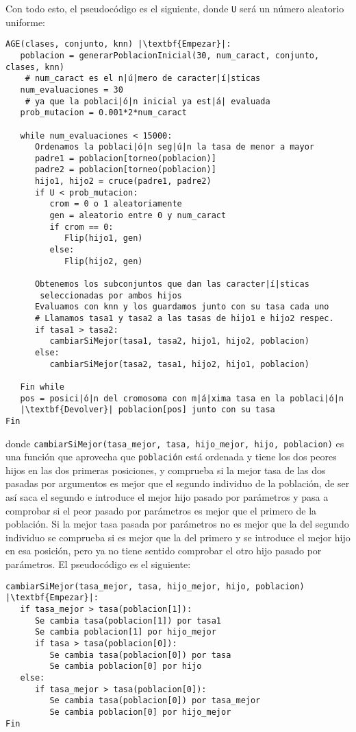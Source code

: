 \documentclass[12pt]{article}
\begin{document}
Con todo esto, el pseudocódigo es el siguiente, donde \texttt{U} será un número aleatorio uniforme:
\begin{lstlisting}
AGE(clases, conjunto, knn) |\textbf{Empezar}|:
   poblacion = generarPoblacionInicial(30, num_caract, conjunto, clases, knn)
    # num_caract es el n|ú|mero de caracter|í|sticas
   num_evaluaciones = 30
    # ya que la poblaci|ó|n inicial ya est|á| evaluada
   prob_mutacion = 0.001*2*num_caract
   
   while num_evaluaciones < 15000:
      Ordenamos la poblaci|ó|n seg|ú|n la tasa de menor a mayor
      padre1 = poblacion[torneo(poblacion)]
      padre2 = poblacion[torneo(poblacion)]
      hijo1, hijo2 = cruce(padre1, padre2)
      if U < prob_mutacion:
         crom = 0 o 1 aleatoriamente
         gen = aleatorio entre 0 y num_caract
         if crom == 0:
            Flip(hijo1, gen)
         else:
            Flip(hijo2, gen)
      
      Obtenemos los subconjuntos que dan las caracter|í|sticas 
       seleccionadas por ambos hijos
      Evaluamos con knn y los guardamos junto con su tasa cada uno
      # Llamamos tasa1 y tasa2 a las tasas de hijo1 e hijo2 respec.
      if tasa1 > tasa2:
         cambiarSiMejor(tasa1, tasa2, hijo1, hijo2, poblacion)
      else:
         cambiarSiMejor(tasa2, tasa1, hijo2, hijo1, poblacion)
      
   Fin while
   pos = posici|ó|n del cromosoma con m|á|xima tasa en la poblaci|ó|n
   |\textbf{Devolver}| poblacion[pos] junto con su tasa
Fin
\end{lstlisting}

donde \texttt{cambiarSiMejor(tasa\_mejor, tasa, hijo\_mejor, hijo, poblacion)} es una función que aprovecha que \texttt{población} está ordenada y tiene los dos peores hijos en las dos primeras posiciones, y comprueba si la mejor tasa de las dos pasadas por argumentos es mejor que el segundo individuo de la población, de ser así saca el segundo e introduce el mejor hijo pasado por parámetros y pasa a comprobar si el peor pasado por parámetros es mejor que el primero de la población. Si la mejor tasa pasada por parámetros no es mejor que la del segundo individuo se comprueba si es mejor que la del primero y se introduce el mejor hijo en esa posición, pero ya no tiene sentido comprobar el otro hijo pasado por parámetros. El pseudocódigo es el siguiente:
\begin{lstlisting}
cambiarSiMejor(tasa_mejor, tasa, hijo_mejor, hijo, poblacion) |\textbf{Empezar}|:
   if tasa_mejor > tasa(poblacion[1]):
      Se cambia tasa(poblacion[1]) por tasa1
      Se cambia poblacion[1] por hijo_mejor
      if tasa > tasa(poblacion[0]):
         Se cambia tasa(poblacion[0]) por tasa
         Se cambia poblacion[0] por hijo
   else:
      if tasa_mejor > tasa(poblacion[0]):
         Se cambia tasa(poblacion[0]) por tasa_mejor
         Se cambia poblacion[0] por hijo_mejor
Fin
\end{lstlisting}
\end{document}
